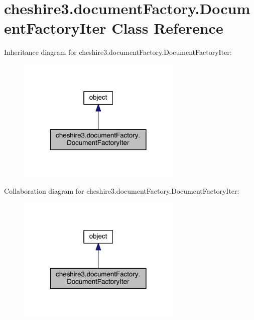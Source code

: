 \hypertarget{classcheshire3_1_1document_factory_1_1_document_factory_iter}{\section{cheshire3.\-document\-Factory.\-Document\-Factory\-Iter Class Reference}
\label{classcheshire3_1_1document_factory_1_1_document_factory_iter}
}


Inheritance diagram for cheshire3.\-document\-Factory.\-Document\-Factory\-Iter\-:
\nopagebreak
\begin{figure}[H]
\begin{center}
\leavevmode
\includegraphics[width=222pt]{classcheshire3_1_1document_factory_1_1_document_factory_iter__inherit__graph}
\end{center}
\end{figure}


Collaboration diagram for cheshire3.\-document\-Factory.\-Document\-Factory\-Iter\-:
\nopagebreak
\begin{figure}[H]
\begin{center}
\leavevmode
\includegraphics[width=222pt]{classcheshire3_1_1document_factory_1_1_document_factory_iter__coll__graph}
\end{center}
\end{figure}
